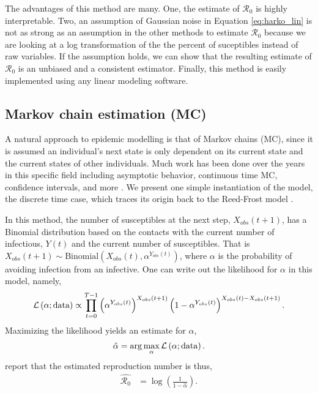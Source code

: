 \documentclass[12pt]{article}
\newcommand{\rr}{\ensuremath{\mathcal{R}_0}}
\begin{document}
The advantages of this method are many.  One, the estimate of $\rr$ is highly interpretable.  Two, an assumption of Gaussian noise in Equation \ref{eq:harko_lin} is not as strong as an assumption in the other methods to estimate $\rr$ because we are looking at a log transformation of the the percent of suceptibles instead of raw variables.  If the assumption holds, we can show that the resulting estimate of $\rr$ is an unbiased and a consistent estimator.  Finally,  this method is easily implemented using any linear modeling software.  

\subsection{Markov chain estimation (MC)}
A natural approach to epidemic modelling is that of Markov chains (MC), since it is assumed an individual's next state is only dependent on its current state and the current states of other individuals.  Much work has been done over the years in this specific field including asymptotic behavior, continuous time MC, confidence intervals, and more \citep{jacquez1991,gani1995,daley2001epidemic}.  We present one simple instantiation of the model, the discrete time case, which traces its origin back to the Reed-Frost model \citep{abbey1952}.

In this method, the number of susceptibles at the next step, $X_{obs}(t+1)$, has a Binomial distribution based on the contacts with the current number of infectious, $Y(t)$ and the current number of susceptibles.  That is $X_{obs}(t+1) \sim \text{Binomial}\left(X_{obs}(t), \alpha^{Y_{obs}(t)}\right)$, where $\alpha$ is the probability of avoiding infection from an infective.  One can write out the likelihood for $\alpha$ in this model, namely,
\begin{align*}
\mathcal{L}\left ( \alpha ; \textnormal{data}\right ) \propto \prod_{t=0}^{T-1}\left ( \alpha^{Y_{obs}(t)} \right )^{X_{obs}(t+1)} \left (1- \alpha^{Y_{obs}(t)} \right )^{X_{obs}(t) - X_{obs}(t+1)}.
\end{align*}
Maximizing the likelihood yields an estimate for $\alpha$,
\begin{align*}
\hat{\alpha} = \arg \max_{\alpha} \mathcal{L}\left(\alpha; \textnormal{data} \right ).
  \end{align*}
 \cite{barbour2004} report that the estimated reproduction number is thus,
\begin{align}\label{eq:r0-mc}
\hat{\rr} &= \log \left ( \frac{1}{1-\hat{\alpha}}\right ).
\end{align}
\end{document}
